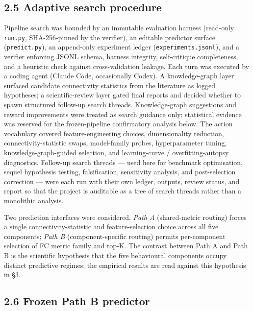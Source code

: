 \documentclass[11pt,letterpaper]{report}
\begin{document}
\subsection*{2.5 Adaptive search procedure}

Pipeline search was bounded by an immutable evaluation harness (read-only \texttt{run.py}, SHA-256-pinned by the verifier), an editable predictor surface (\texttt{predict.py}), an append-only experiment ledger (\texttt{experiments.jsonl}), and a verifier enforcing JSONL schema, harness integrity, self-critique completeness, and a heuristic check against cross-validation leakage. Each turn was executed by a coding agent (Claude Code, occasionally Codex). A knowledge-graph layer surfaced candidate connectivity statistics from the literature as logged hypotheses; a scientific-review layer gated final reports and decided whether to spawn structured follow-up search threads. Knowledge-graph suggestions and reward improvements were treated as search guidance only; statistical evidence was reserved for the frozen-pipeline confirmatory analysis below. The action vocabulary covered feature-engineering choices, dimensionality reduction, connectivity-statistic swaps, model-family probes, hyperparameter tuning, knowledge-graph-guided selection, and learning-curve / overfitting-autopsy diagnostics. Follow-up search threads --- used here for benchmark optimisation, sequel hypothesis testing, falsification, sensitivity analysis, and post-selection correction --- were each run with their own ledger, outputs, review status, and report so that the project is auditable as a tree of search threads rather than a monolithic analysis.

Two prediction interfaces were considered. \emph{Path A} (shared-metric routing) forces a single connectivity-statistic and feature-selection choice across all five components; \emph{Path B} (component-specific routing) permits per-component selection of FC metric family and top-K. The contrast between Path A and Path B is the scientific hypothesis that the five behavioural components occupy distinct predictive regimes; the empirical results are read against this hypothesis in \S3.

\subsection*{2.6 Frozen Path B predictor}
\end{document}
